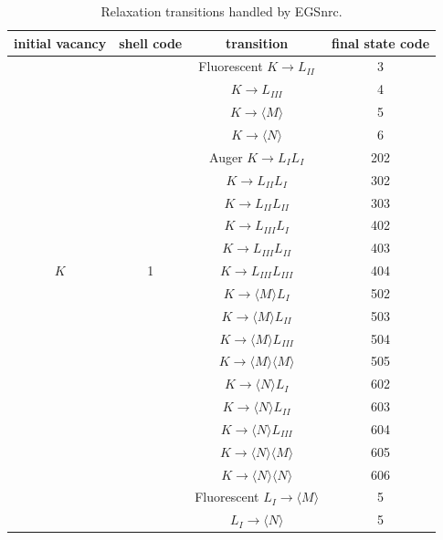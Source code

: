 \begin{table}[phtb]
\caption{\label{relax_transitions} Relaxation transitions handled
by EGSnrc.}
\begin{center}
\begin{tabular}{|c|c|c|c|}
\hline \hline
initial vacancy & shell code & transition & final state code \\
\hline \hline 
 & & Fluorescent $K \to L_{II}$ & \phantom{00}3 \\
 & & \phantom{Fluorescent} $K \to L_{III}$ & \phantom{00}4 \\
 & & \phantom{Fluorescent} $K \to \langle M \rangle$ & \phantom{00}5 \\
 & & \phantom{Fluorescent} $K \to \langle N \rangle$ & \phantom{00}6 \\
 & & Auger $K \to L_I L_I$ & 202 \\
 & & \phantom{Auger} $K \to L_{II} L_{I}$ & 302 \\
 & & \phantom{Auger} $K \to L_{II} L_{II}$ & 303 \\
 & & \phantom{Auger} $K \to L_{III} L_{I}$ & 402 \\
 & & \phantom{Auger} $K \to L_{III} L_{II}$ & 403 \\
 $K$ & 1 & \phantom{Auger} $K \to L_{III} L_{III}$ & 404 \\
 & & \phantom{Auger} $K \to \langle M \rangle L_{I}$ & 502 \\
 & & \phantom{Auger} $K \to \langle M \rangle L_{II}$ & 503 \\
 & & \phantom{Auger} $K \to \langle M \rangle L_{III}$ & 504 \\
 & & \phantom{Auger} $K \to \langle M \rangle \langle M \rangle $ & 505 \\
 & & \phantom{Auger} $K \to \langle N \rangle L_{I}$ & 602 \\
 & & \phantom{Auger} $K \to \langle N \rangle L_{II}$ & 603 \\
 & & \phantom{Auger} $K \to \langle N \rangle L_{III}$ & 604 \\
 & & \phantom{Auger} $K \to \langle N \rangle \langle M \rangle $ & 605 \\
 & & \phantom{Auger} $K \to \langle N \rangle \langle N \rangle $ & 606 \\
\hline
& & Fluorescent $L_I \to \langle M \rangle$ & \phantom{00}5 \\
& & \phantom{Fluorescent} $L_I \to \langle N \rangle$ & \phantom{00}5 \\

\end{tabular}
\end{center}
\end{table}
